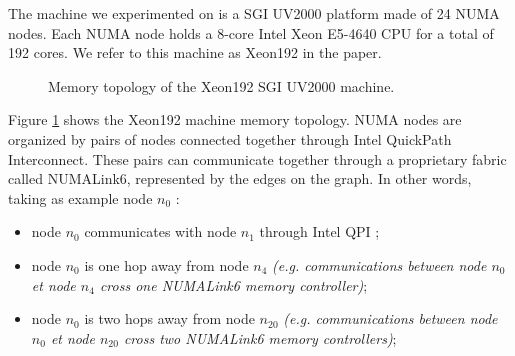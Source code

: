 \documentclass{Styles/llncs}
\begin{document}
The machine we experimented on is a SGI UV2000 platform made of 24 NUMA nodes.
Each NUMA node holds a 8-core Intel Xeon E5-4640 CPU for a total of 192 cores.
We refer to this machine as Xeon192 in the paper. 

\begin{figure}
\begin{center}
\end{center}
\caption{Memory topology of the Xeon192 SGI UV2000 machine.}
\label{fig:idchire}
\end{figure}

Figure \ref{fig:idchire} shows the Xeon192 machine memory topology.
NUMA nodes are organized by pairs of nodes connected together through Intel QuickPath Interconnect.
These pairs can communicate together through a proprietary fabric called NUMALink6, represented by the edges on the graph.
In other words, taking as example node $n_0$ :
\begin{itemize}
\item node $n_0$ communicates with node $n_1$ through Intel QPI ;
\item node $n_0$ is one hop away from node $n_4$ \emph{(e.g. communications between node $n_0$ et node $n_4$ cross one NUMALink6 memory controller)};
\item node $n_0$ is two hops away from node $n_{20}$ \emph{(e.g. communications between node $n_0$ et node $n_{20}$ cross two NUMALink6 memory controllers)};
\end{itemize}
\end{document}

